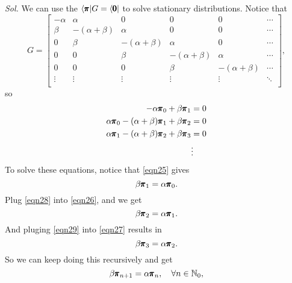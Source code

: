 \begin{enumerate}
\begin{itemize}
        \textit{ Sol. } We can use the $\langle \pmb{\pi} | G = \langle \pmb{0} |$ 
        to solve stationary distributions. Notice that 
        \begin{equation*}
            G = 
            \begin{bmatrix}
                - \alpha & \alpha & 0 & 0 & 0 & \cdots \\ 
                \beta & -(\alpha+\beta) & \alpha & 0 & 0 & \cdots \\ 
                0 & \beta & -(\alpha+\beta) & \alpha & 0 & \cdots \\ 
                0 & 0 & \beta & -(\alpha+\beta) & \alpha & \cdots \\ 
                0 & 0 & 0 & \beta & - (\alpha+\beta) & \cdots \\ 
                \vdots & \vdots & \vdots & \vdots & \vdots &  \ddots \\
            \end{bmatrix},
        \end{equation*}
        so 
        \begin{align}
            -\alpha \pmb{\pi}_0 + \beta \pmb{\pi}_1 & = 0 \label{eqn25}\\ 
            \alpha \pmb{\pi}_0 - (\alpha + \beta) \pmb{\pi}_1 + \beta \pmb{\pi}_2 &= 0 \label{eqn26}\\ 
            \alpha \pmb{\pi}_1 - (\alpha + \beta) \pmb{\pi}_2 + \beta \pmb{\pi}_3 & = 0 \label{eqn27}\\ 
            & \vdots \notag
        \end{align}
        To solve these equations, notice that \eqref{eqn25} gives
        \begin{equation}\label{eqn28}
            \beta \pmb{\pi}_1 = \alpha \pmb{\pi}_0.
        \end{equation}
        Plug \eqref{eqn28} into \eqref{eqn26}, and we get 
        \begin{equation}\label{eqn29}
            \beta \pmb{\pi}_2 = \alpha \pmb{\pi}_1.
        \end{equation}
        And pluging \eqref{eqn29} into \eqref{eqn27} results in 
        \begin{equation}
            \beta \pmb{\pi}_3 = \alpha \pmb{\pi}_2.
        \end{equation}
        So we can keep doing this recursively and get 
        \begin{equation*}
            \beta \mbf{\pi}_{n+1} = \alpha \mbf{\pi}_{n}, \quad \forall n \in \mbb{N}_0,

\end{equation*}
\end{itemize}
\end{enumerate}
